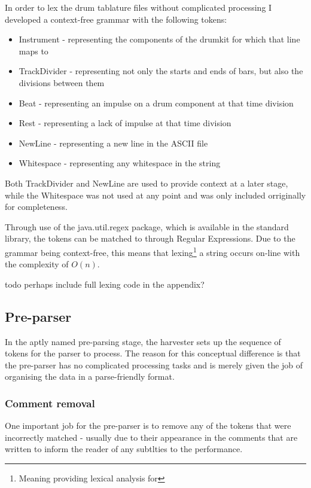 \documentclass[12pt,twoside,notitlepage]{report}
\begin{document}
		In order to lex the drum tablature files without complicated processing I developed a context-free grammar with the following tokens:
		\begin{itemize}
			\item{Instrument - representing the components of the drumkit for which that line maps to}
			\item{TrackDivider - representing not only the starts and ends of bars, but also the divisions between them}
			\item{Beat - representing an impulse on a drum component at that time division}
			\item{Rest - representing a lack of impulse at that time division}
			\item{NewLine - representing a new line in the ASCII file}
			\item{Whitespace - representing any whitespace in the string}
		\end{itemize}
		Both TrackDivider and NewLine are used to provide context at a later stage, while the Whitespace was not used at any point and was only included orriginally for completeness.
		
		Through use of the java.util.regex package, which is available in the standard library, the tokens can be matched to through Regular Expressions. Due to the grammar being context-free, this means that lexing\footnote{Meaning providing lexical analysis for} a string occurs on-line with the complexity of $O(n)$.
		
		
		todo perhaps include full lexing code in the appendix?
		\subsection{Pre-parser}
			In the aptly named pre-parsing stage, the harvester sets up the sequence of tokens for the parser to process. The reason for this conceptual difference is that the pre-parser has no complicated processing tasks and is merely given the job of organising the data in a parse-friendly format. 
			
			\subsubsection{Comment removal}
			One important job for the pre-parser is to remove any of the tokens that were incorrectly matched - usually due to their appearance in the comments that are written to inform the reader of any subtlties to the performance. 
			
\end{document}
